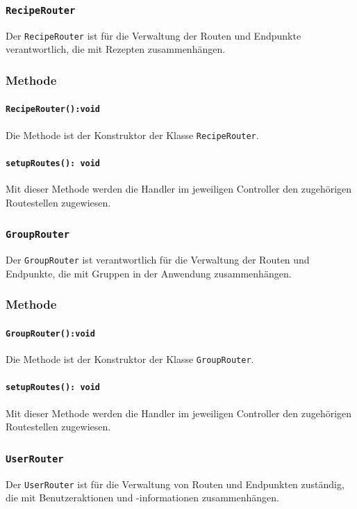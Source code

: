\documentclass{entwurfsheft}
\begin{document}
\begin{sloppypar}
\subsubsection{\texttt{RecipeRouter}}\label{sec:RecipeRouter}
Der \texttt{RecipeRouter} ist für die Verwaltung der Routen und Endpunkte verantwortlich, die mit Rezepten zusammenhängen.
\subsubsection*{Methode}
\paragraph{\texttt{RecipeRouter():void}}
Die Methode ist der Konstruktor der Klasse \texttt{RecipeRouter}.
\paragraph{\texttt{setupRoutes(): void}}
Mit dieser Methode werden die Handler im jeweiligen Controller den zugehörigen Routestellen zugewiesen.

\subsubsection{\texttt{GroupRouter}}\label{sec:GroupRouter}
Der \texttt{GroupRouter} ist verantwortlich für die Verwaltung der Routen und Endpunkte, die mit Gruppen in der Anwendung zusammenhängen.
\subsubsection*{Methode}
\paragraph{\texttt{GroupRouter():void}}
Die Methode ist der Konstruktor der Klasse \texttt{GroupRouter}.
\paragraph{\texttt{setupRoutes(): void}}
Mit dieser Methode werden die Handler im jeweiligen Controller den zugehörigen Routestellen zugewiesen.

\subsubsection{\texttt{UserRouter}}\label{sec:UserRouter}
Der \texttt{UserRouter} ist für die Verwaltung von Routen und Endpunkten zuständig, die mit Benutzeraktionen und -informationen zusammenhängen.

\end{sloppypar}
\end{document}

